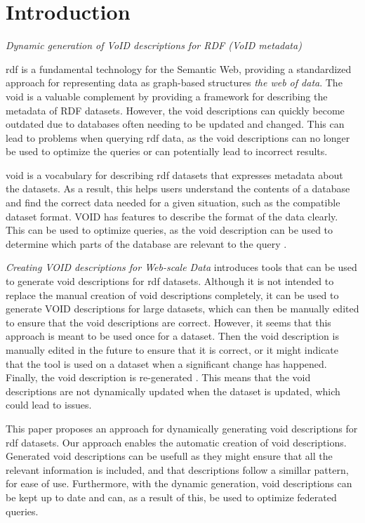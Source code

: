\section{Introduction}\label{sec:introduction2}
\emph{Dynamic generation of VoID descriptions for RDF (VoID metadata)}

\gls{rdf} is a fundamental technology for the Semantic Web, providing a standardized approach for representing data as graph-based structures \emph{the web of data}. The \gls{void} is a valuable complement by providing a framework for describing the metadata of RDF datasets. However, the \gls{void} descriptions can quickly become outdated due to databases often needing to be updated and changed. This can lead to problems when querying \gls{rdf} data, as the \gls{void} descriptions can no longer be used to optimize the queries or can potentially lead to incorrect results.

\gls{void} is a vocabulary for describing \gls{rdf} datasets that expresses metadata about the datasets. As a result, this helps users understand the contents of a database and find the correct data needed for a given situation, such as the compatible dataset format. VOID has features to describe the format of the data clearly. This can be used to optimize queries, as the \gls{void} description can be used to determine which parts of the database are relevant to the query .

\emph{Creating VOID descriptions for Web-scale Data} introduces tools that can be used to generate \gls{void} descriptions for \gls{rdf} datasets. Although it is not intended to replace the manual creation of \gls{void} descriptions completely, it can be used to generate VOID descriptions for large datasets, which can then be manually edited to ensure that the \gls{void} descriptions are correct. However, it seems that this approach is meant to be used once for a dataset. Then the \gls{void} description is manually edited in the future to ensure that it is correct, or it might indicate that the tool is used on a dataset when a significant change has happened. Finally, the \gls{void} description is re-generated . This means that the \gls{void} descriptions are not dynamically updated when the dataset is updated, which could lead to issues.

This paper proposes an approach for dynamically generating \gls{void} descriptions for \gls{rdf} datasets. Our approach enables the automatic creation of \gls{void} descriptions. Generated \gls{void} descriptions can be usefull as they might ensure that all the relevant information is included, and that descriptions follow a simillar pattern, for ease of use. Furthermore, with the dynamic generation, \gls{void} descriptions can be kept up to date and can, as a result of this, be used to optimize federated queries.



